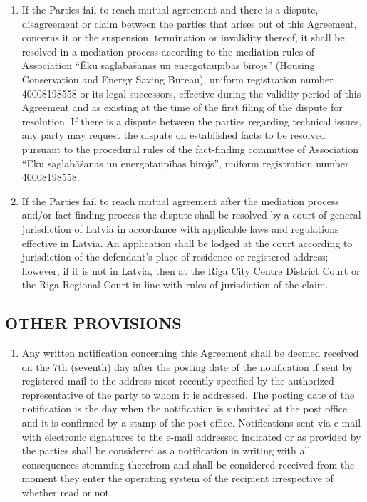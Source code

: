 \documentclass[a4paper]{article}
\begin{document}
\begin{multicols}{2}
\begin{enumerate}
  \item{If the Parties fail to reach mutual agreement and there is a
      dispute, disagreement or claim between the parties that arises
      out of this Agreement, concerns it or the suspension,
      termination or invalidity thereof, it shall be resolved in a
      mediation process according to the mediation rules of
      Association “Ēku saglabāšanas un energotaupības birojs” (Housing
      Conservation and Energy Saving Bureau), uniform registration
      number 40008198558 or its legal successors, effective during the
      validity period of this Agreement and as existing at the time of
      the first filing of the dispute for resolution. If there is a
      dispute between the parties regarding technical issues, any
      party may request the dispute on established facts to be
      resolved pursuant to the procedural rules of the fact{-}finding
      committee of Association “Ēku saglabāšanas un energotaupības
      birojs”, uniform registration number 40008198558.}

  \item{If the Parties fail to reach mutual agreement after the
      mediation process and/or fact{-}finding process the dispute
      shall be resolved by a court of general jurisdiction of Latvia
      in accordance with applicable laws and regulations effective in
      Latvia. An application shall be lodged at the court according to
      jurisdiction of the defendant’s place of residence or registered
      address; however, if it is not in Latvia, then at the Riga City
      Centre District Court or the Riga Regional Court in line with
      rules of jurisdiction of the claim.}
  \end{enumerate}

  \subsection{OTHER PROVISIONS}

  \begin{enumerate}
  \item{Any written notification concerning this Agreement shall be
      deemed received on the 7th (seventh) day after the posting date
      of the notification if sent by registered mail to the address
      most recently specified by the authorized representative of the
      party to whom it is addressed. The posting date of the
      notification is the day when the notification is submitted at
      the post office and it is confirmed by a stamp of the post
      office. Notifications sent via e{-}mail with electronic
      signatures to the e{-}mail addressed indicated or as provided by
      the parties shall be considered as a notification in writing
      with all consequences stemming therefrom and shall be considered
      received from the moment they enter the operating system of the
      recipient irrespective of whether read or not.}


\end{enumerate}
\end{multicols}
\end{document}
